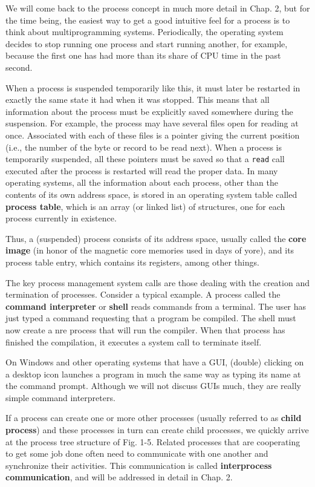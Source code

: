 \documentclass{book}
\newcommand {\kw}  [1] {\textbf{#1}}
\newcommand {\cmd} [1] {\texttt{#1}}
\begin{document}
We will come back to the process concept in much more detail in Chap. 2, but for the time being, 
the easiest way to get a good intuitive feel for a process is to think about multiprogramming systems.
Periodically, the operating system decides to stop running one process and start running another, for example, 
because the first one has had more than its share of CPU time in the past second.

When a process is suspended temporarily like this, it must later be restarted in exactly the same state it had when it was stopped.
This means that all information about the process must be explicitly saved somewhere during the suspension.
For example, the process may have several files open for reading at once.
Associated with each of these files is a pointer giving the current position (i.e., the number of the byte or record to be read next).
When a process is temporarily suspended, all these pointers must be saved so that 
a \cmd{read} call executed after the process is restarted will read the proper data.
In many operating systems, all the information about each process, other than the contents of its own address space, 
is stored in an operating system table called \kw{process table}, which is an array (or linked list) of structures, 
one for each process currently in existence.

Thus, a (suspended) process consists of its address space, usually called the \kw{core image} 
(in honor of the magnetic core memories used in days of yore),
and its process table entry, which contains its registers, among other things. 

The key process management system calls are those dealing with the creation and termination of processes.
Consider a typical example.
A process called the \kw{command interpreter} or \kw{shell} reads commands from a terminal.
The user has just typed a command requesting that a program be compiled.
The shell must now create a nre process that will run the compiler.
When that process has finished the compilation, it executes a system call to terminate itself.

On Windows and other operating systems that have a GUI, (double) clicking on a desktop icon launches a program in much the same way 
as typing its name at the command prompt.
Although we will not discuss GUIs much, they are really simple command interpreters.

If a process can create one or more other processes (usually referred to as \kw{child process}) and these processes in turn can create child processes, 
we quickly arrive at the process tree structure of Fig. 1-5.
Related processes that are cooperating to get some job done often need to communicate with one another and synchronize their activities.
This communication is called \kw{interprocess communication}, and will be addressed in detail in Chap. 2.
\end{document}
